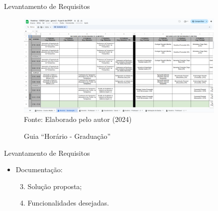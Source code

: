 \begin{frame}{Levantamento de Requisitos}
    \begin{figure}
        \centering
        \vspace{-0.5cm}
        \caption{Guia ``Horário - Graduação''}
        \vspace{-0.2cm}
        \includegraphics[width=0.9\textwidth]{figuras/plan-ant-2.png}
        \\ %
        \small Fonte: Elaborado pelo autor (2024)
    \end{figure}
\end{frame}

\begin{frame}{Levantamento de Requisitos}
    \begin{itemize}
        \item Documentação: \vspace{0.5cm}
              \begin{enumerate}
                  \setcounter{enumi}{2}
                  \item Solução proposta; \vspace{0.5cm}
                  \item Funcionalidades desejadas. \vspace{0.5cm}
              \end{enumerate}
    \end{itemize}
\end{frame}

